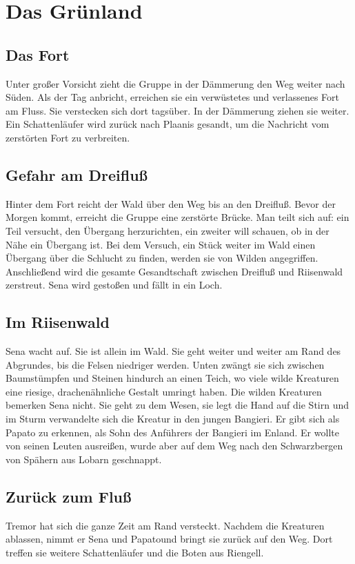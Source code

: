 \documentclass[12pt,a4paper,onecolumn,oneside,ngerman]{book}
\newcommand{\Sena}{Sena}
\newcommand{\Bangiri}{Bangieri}
\newcommand{\Papato}{Papato}
\newcommand{\Enland}{Enland}
\newcommand{\Schattenlaufer}{Schattenläufer}
\newcommand{\Tremor}{Tremor}
\newcommand{\Lobarn}{Lobarn}
\newcommand{\Rhingell}{Riengell}
\newcommand{\Dreifluss}{Dreifluß}
\newcommand{\Planis}{Plaanis}
\newcommand{\Grunland}{Grünland}
\newcommand{\Riesenwald}{Riisenwald}
\begin{document}
\part{Das \Grunland}
\chapter{Das Fort}
Unter großer Vorsicht zieht die Gruppe in der Dämmerung den Weg weiter nach Süden.\linebreak
Als der Tag anbricht, erreichen sie ein verwüstetes und verlassenes Fort am Fluss. Sie verstecken sich dort tagsüber. In der Dämmerung ziehen sie weiter. Ein  {\Schattenlaufer} wird zurück nach {\Planis} gesandt, um die Nachricht vom zerstörten Fort zu verbreiten.

\chapter{Gefahr am \Dreifluss}
Hinter dem Fort reicht der Wald über den Weg bis an den {\Dreifluss}. Bevor der Morgen kommt, erreicht die Gruppe eine zerstörte Brücke.\linebreak
Man teilt sich auf: ein Teil versucht, den Übergang herzurichten, ein zweiter will schauen, ob in der Nähe ein Übergang ist. Bei dem Versuch, ein Stück weiter im Wald einen Übergang über die Schlucht zu finden, werden sie von Wilden angegriffen. Anschließend wird die gesamte Gesandtschaft zwischen {\Dreifluss} und {\Riesenwald} zerstreut.  {\Sena} wird gestoßen und fällt in ein Loch.

\chapter{Im \Riesenwald}
{\Sena} wacht auf. Sie ist allein im Wald. Sie geht weiter und weiter am Rand des Abgrundes, bis die Felsen niedriger werden. Unten zwängt sie sich zwischen Baumstümpfen und Steinen hindurch an einen Teich, wo viele wilde Kreaturen eine riesige, drachenähnliche Gestalt umringt haben.\linebreak
Die wilden Kreaturen bemerken {\Sena} nicht. Sie geht zu dem Wesen, sie legt die Hand auf die Stirn und im Sturm verwandelte sich die Kreatur in den jungen {\Bangiri}. Er gibt sich als {\Papato} zu erkennen, als Sohn des Anführers der {\Bangiri} im {\Enland}. Er wollte von seinen Leuten ausreißen, wurde aber auf dem Weg nach den Schwarzbergen von Spähern aus {\Lobarn} geschnappt. 

\chapter{Zurück zum Fluß}
{\Tremor} hat sich die ganze Zeit am Rand versteckt. Nachdem die Kreaturen ablassen, nimmt er {\Sena} und \Papato  und bringt sie zurück auf den Weg. Dort treffen sie weitere {\Schattenlaufer} und die Boten aus {\Rhingell}.
\end{document}
